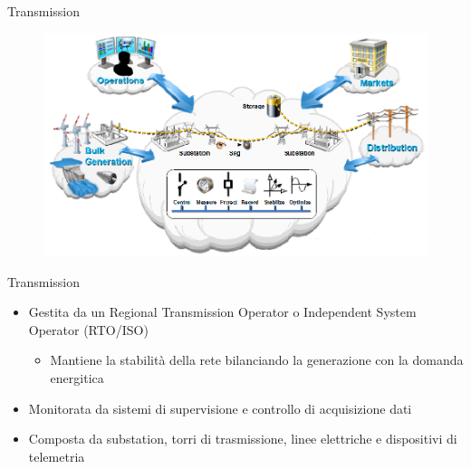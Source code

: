 \begin{frame}[fragile]{Transmission}
	\begin{figure}[h] 
		\includegraphics[scale=0.45]{imgs/tras.png}
	\end{figure}
\end{frame}

\begin{frame}[fragile]{Transmission}
	\begin{itemize}[<+- | alert@+>]
		\item Gestita da un Regional Transmission Operator o Independent System Operator (RTO/ISO)
			\begin{itemize}
				\item Mantiene la stabilità della rete bilanciando la generazione con la domanda energitica
			\end{itemize}				
		\item Monitorata da sistemi di supervisione e controllo di acquisizione dati
		\item Composta da substation, torri di trasmissione, linee elettriche e dispositivi di telemetria	 
	\end{itemize}
\end{frame}

